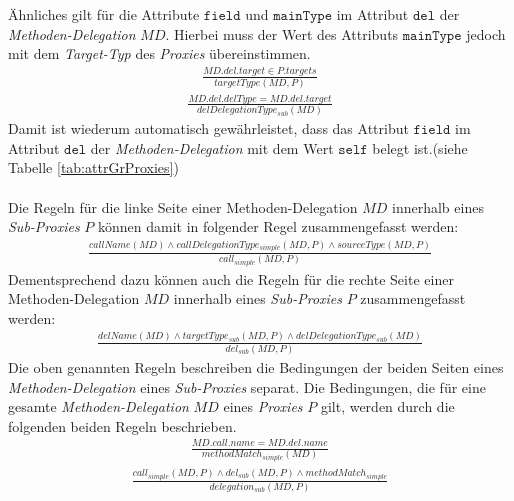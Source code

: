 \\\\
Ähnliches gilt für die Attribute $\texttt{field}$ und $\texttt{mainType}$ im Attribut $\texttt{del}$ der \emph{Methoden-Delegation} $\mathit{MD}$. Hierbei muss der Wert des Attributs $\texttt{mainType}$ jedoch mit dem \emph{Target-Typ} des \emph{Proxies} übereinstimmen.
\begin{gather*}
\frac{\mathit{MD.del.target} \in \mathit{P.targets} }
{\mathit{targetType(MD, P)}}
\end{gather*}
\begin{gather*}
\frac{\mathit{MD.del.delType} = \mathit{MD.del.target} }
{\mathit{delDelegationType_{sub}(MD)}}
\end{gather*}
Damit ist wiederum automatisch gewährleistet, dass das Attribut $\texttt{field}$ im Attribut $\texttt{del}$ der \emph{Methoden-Delegation} mit dem Wert $\texttt{self}$ belegt ist.(siehe Tabelle \ref{tab:attrGrProxies})
\\\\
Die Regeln für die linke Seite einer Methoden-Delegation $\mathit{MD}$ innerhalb eines \emph{Sub-Proxies} $P$ können damit in folgender Regel zusammengefasst werden:
\begin{gather*}
\frac{\mathit{callName(MD)} \wedge \mathit{callDelegationType_{simple}(MD,P)} \wedge \mathit{sourceType(MD,P)}}
{\mathit{call_{simple}(MD,P)}}
\end{gather*}
Dementsprechend dazu können auch die Regeln für die rechte Seite einer Methoden-Delegation $\mathit{MD}$ innerhalb eines \emph{Sub-Proxies} $P$ zusammengefasst werden:
\begin{gather*}
\frac{\mathit{delName(MD)} \wedge \mathit{targetType_{sub}(MD,P) \wedge \mathit{delDelegationType_{sub}(MD)}}}
{\mathit{del_{sub}(MD,P)}}
\end{gather*}
\noindent
Die oben genannten Regeln beschreiben die Bedingungen der beiden Seiten eines \emph{Methoden-Delegation} eines \emph{Sub-Proxies} separat. Die Bedingungen, die für eine gesamte \emph{Methoden-Delegation} $MD$ eines \emph{Proxies} $P$ gilt, werden durch die folgenden beiden Regeln beschrieben.
\begin{gather*}
\frac{\mathit{MD.call.name} = \mathit{MD.del.name}}
{\mathit{methodMatch_{simple}(MD)}}
\end{gather*}
\begin{gather*}
\frac{\mathit{call_{simple}(MD, P)} \wedge \mathit{del_{sub}(MD, P)} \wedge \mathit{methodMatch_{simple}}}
{\mathit{delegation_{sub}(MD, P)}}
\end{gather*}
